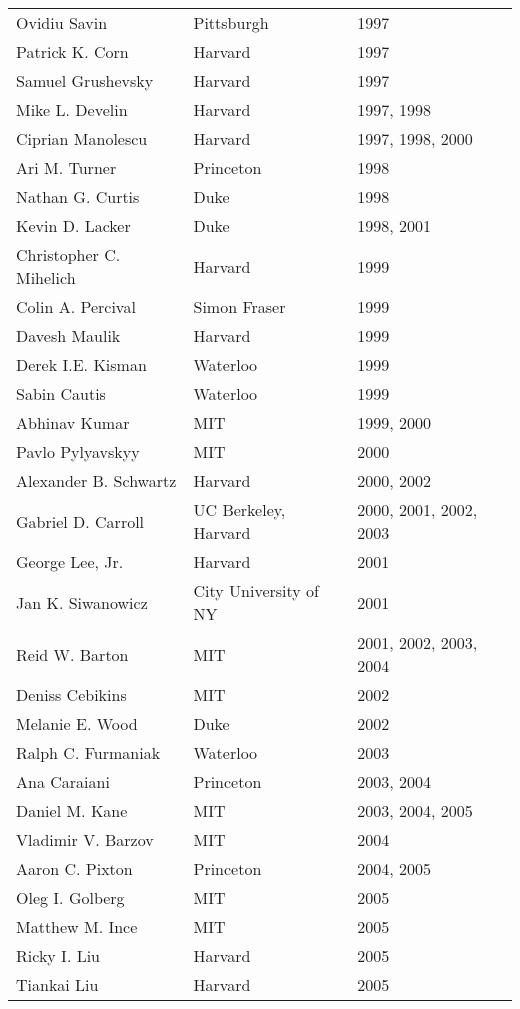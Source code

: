 \documentclass[12pt]{article}
\begin{document}
\begin{tabular}{|l|l|l|}
Ovidiu Savin & Pittsburgh & 1997 \\
Patrick K. Corn & Harvard & 1997 \\
Samuel Grushevsky & Harvard & 1997 \\
Mike L. Develin & Harvard & 1997, 1998 \\
Ciprian Manolescu & Harvard & 1997, 1998, 2000 \\
Ari M. Turner & Princeton & 1998 \\
Nathan G. Curtis & Duke & 1998 \\
Kevin D. Lacker & Duke & 1998, 2001 \\
Christopher C. Mihelich & Harvard & 1999 \\
Colin A. Percival & Simon Fraser & 1999 \\
Davesh Maulik & Harvard & 1999 \\
Derek I.E. Kisman & Waterloo & 1999 \\
Sabin Cautis & Waterloo & 1999 \\
Abhinav Kumar & MIT & 1999, 2000 \\
Pavlo Pylyavskyy & MIT & 2000 \\
Alexander B. Schwartz & Harvard & 2000, 2002 \\
Gabriel D. Carroll & UC Berkeley, Harvard & 2000, 2001, 2002, 2003 \\
George Lee, Jr. & Harvard & 2001 \\
Jan K. Siwanowicz & City University of NY & 2001 \\
Reid W. Barton & MIT & 2001, 2002, 2003, 2004 \\
Deniss Cebikins & MIT & 2002 \\
Melanie E. Wood & Duke & 2002 \\
Ralph C. Furmaniak & Waterloo & 2003 \\
Ana Caraiani & Princeton & 2003, 2004 \\
Daniel M. Kane & MIT & 2003, 2004, 2005 \\
Vladimir V. Barzov & MIT & 2004 \\
Aaron C. Pixton & Princeton & 2004, 2005 \\
Oleg I. Golberg & MIT & 2005 \\
Matthew M. Ince & MIT & 2005 \\
Ricky I. Liu & Harvard & 2005 \\
Tiankai Liu & Harvard & 2005 \\
\end{tabular}
\end{document}
